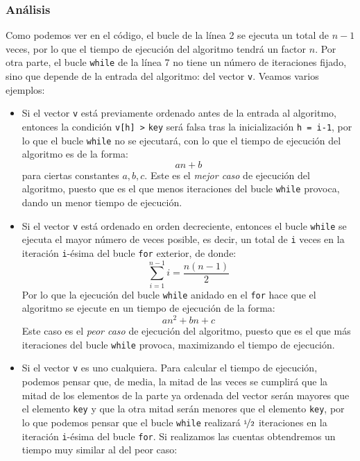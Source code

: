 \subsubsection{Análisis}
Como podemos ver en el código, el bucle de la línea 2 se ejecuta un total de $n-1$ veces, por lo que el tiempo de ejecución del algoritmo tendrá un factor $n$. Por otra parte, el bucle \texttt{while} de la línea 7 no tiene un número de iteraciones fijado, sino que depende de la entrada del algoritmo: del vector \texttt{v}. Veamos varios ejemplos:
\begin{itemize}
\item Si el vector \texttt{v} está previamente ordenado antes de la entrada al algoritmo, entonces la condición \texttt{v[h] >} \texttt{key} será falsa tras la inicialización \texttt{h = i-1}, por lo que el bucle \texttt{while} no se ejecutará, con lo que el tiempo de ejecución del algoritmo es de la forma:
        \begin{equation*}
            an + b
        \end{equation*}
        para ciertas constantes $a,b,c$. Este es el \textit{mejor caso} de ejecución del algoritmo, puesto que es el que menos iteraciones del bucle \texttt{while} provoca, dando un menor tiempo de ejecución.
    \item Si el vector \texttt{v} está ordenado en orden decreciente, entonces el bucle \texttt{while} se ejecuta el mayor número de veces posible, es decir, un total de \texttt{i} veces en la iteración \texttt{i}-ésima del bucle \texttt{for} exterior, de donde:
        \begin{equation*}
            \sum_{i=1}^{n-1} i = \dfrac{n(n-1)}{2}
        \end{equation*}
        Por lo que la ejecución del bucle \texttt{while} anidado en el \texttt{for} hace que el algoritmo se ejecute en un tiempo de ejecución de la forma:
        \begin{equation*}
            an^2 + bn + c
        \end{equation*}
        Este caso es el \textit{peor caso} de ejecución del algoritmo, puesto que es el que más iteraciones del bucle \texttt{while} provoca, maximizando el tiempo de ejecución.
    \item Si el vector \texttt{v} es uno cualquiera. Para calcular el tiempo de ejecución, podemos pensar que, de media, la mitad de las veces se cumplirá que la mitad de los elementos de la parte ya ordenada del vector serán mayores que el elemento \texttt{key} y que la otra mitad serán menores que el elemento \texttt{key}, por lo que podemos pensar que el bucle \texttt{while} realizará $\nicefrac{\texttt{i}}{2}$ iteraciones en la iteración \texttt{i}-ésima del bucle \texttt{for}. Si realizamos las cuentas obtendremos un tiempo muy similar al del peor caso:

\end{itemize}
